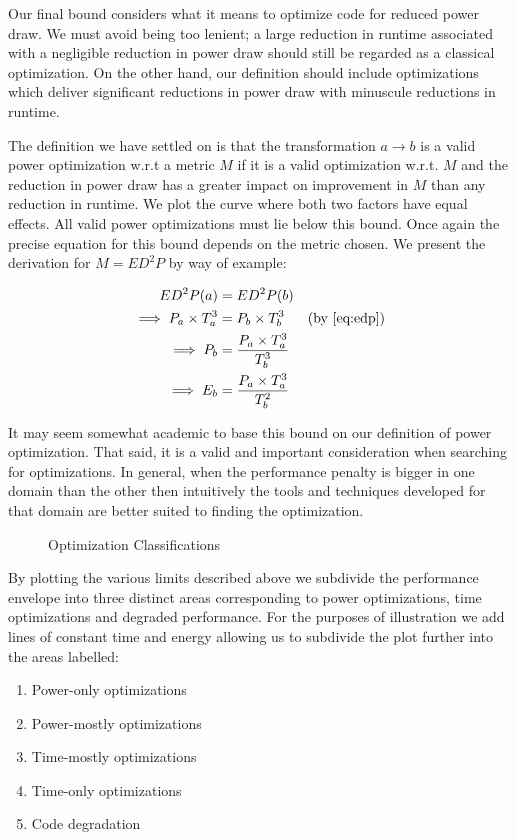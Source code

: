 Our final bound considers what it means to optimize code for reduced power draw. We must avoid being too lenient; a large reduction in runtime associated with a negligible reduction in power draw should still be regarded as a classical optimization. On the other hand, our definition should include optimizations which deliver significant reductions in power draw with minuscule reductions in runtime. 


The definition we have settled on is that the transformation $a \to b$ is a valid power optimization w.r.t a metric $M$ if it is a valid optimization w.r.t. $M$ and the reduction in power draw has a greater impact on improvement in $M$ than any reduction in runtime. We plot the curve where both two factors have equal effects. All valid power optimizations must lie below this bound. Once again the precise equation for this bound depends on the metric chosen. We present the derivation for $M = ED^{2}P$ by way of example:

\begin{align}
ED^2P(a) &= ED^2P(b) \nonumber \\
\implies P_{a} \times T_{a}^{3} &= P_{b} \times T_{b}^{3} \nonumber & \text{(by \ref{eq:edp})}\\
\implies P_{b} &= \frac{P_{a} \times T_{a}^{3}}{T_{b}^3} \nonumber \\
\implies E_{b} &= \frac{P_{a} \times T_{a}^{3}}{T_{b}^2}
\end{align}

It may seem somewhat academic to base this bound on our definition of power optimization. That said, it is a valid and important consideration when searching for optimizations. In general, when the performance penalty is bigger in one domain than the other then intuitively the tools and techniques developed for that domain are better suited to finding the optimization.
\begin{figure}

\caption{Optimization Classifications}\label{fig:pow}
\end{figure}



By plotting the various limits described above we subdivide the performance envelope into three distinct areas corresponding to power optimizations, time optimizations and degraded performance. For the purposes of illustration we add lines of constant time and energy allowing us to subdivide the plot further into the areas labelled:
\begin{enumerate}
\item Power-only optimizations
\item Power-mostly optimizations
\item Time-mostly optimizations
\item Time-only optimizations
\item Code degradation
\end{enumerate}

